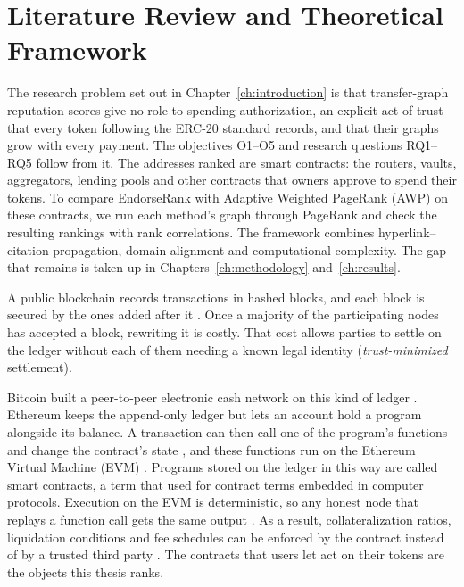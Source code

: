 \chapter{Literature Review and Theoretical Framework}
\label{ch:literature}

The research problem set out in Chapter~\ref{ch:introduction} is that transfer-graph reputation scores give no role to spending authorization, an explicit act of trust that every token following the ERC-20 standard records, and that their graphs grow with every payment. The objectives O1--O5 and research questions RQ1--RQ5 follow from it. The addresses ranked are smart contracts: the routers, vaults, aggregators, lending pools and other contracts that owners approve to spend their tokens. To compare EndorseRank with Adaptive Weighted PageRank (AWP) on these contracts, we run each method's graph through PageRank and check the resulting rankings with rank correlations. The framework combines hyperlink--citation propagation, domain alignment and computational complexity. The gap that remains is taken up in Chapters~\ref{ch:methodology} and~\ref{ch:results}.


A public blockchain records transactions in hashed blocks, and each block is secured by the ones added after it \parencite{nakamoto2008bitcoin}. Once a majority of the participating nodes has accepted a block, rewriting it is costly. That cost allows parties to settle on the ledger without each of them needing a known legal identity (\emph{trust-minimized} settlement).

Bitcoin built a peer-to-peer electronic cash network on this kind of ledger \parencite{nakamoto2008bitcoin}. Ethereum keeps the append-only ledger but lets an account hold a program alongside its balance. A transaction can then call one of the program's functions and change the contract's state \parencite{buterin2014ethereum}, and these functions run on the Ethereum Virtual Machine (EVM) \parencite{wood2025yellowpaper}. Programs stored on the ledger in this way are called smart contracts, a term that \textcite{szabo1997formalizing} used for contract terms embedded in computer protocols. Execution on the EVM is deterministic, so any honest node that replays a function call gets the same output \parencite{wood2025yellowpaper}. As a result, collateralization ratios, liquidation conditions and fee schedules can be enforced by the contract instead of by a trusted third party \parencite{schar2021defi}. The contracts that users let act on their tokens are the objects this thesis ranks.

